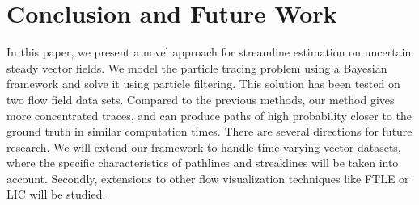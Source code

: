 \section{Conclusion and Future Work}

In this paper, we present a novel approach for streamline estimation on uncertain steady vector fields. We model the particle tracing problem using a Bayesian framework and solve it using particle filtering. This solution has been tested on two flow field data sets. Compared to the previous methods, our method gives more concentrated traces, and can produce paths of high probability closer to the ground truth in similar computation times. There are several directions for future research. We will extend our framework to handle time-varying vector datasets, where the specific characteristics of pathlines and streaklines will be taken into account. Secondly, extensions to other flow visualization techniques like FTLE or LIC will be studied.
